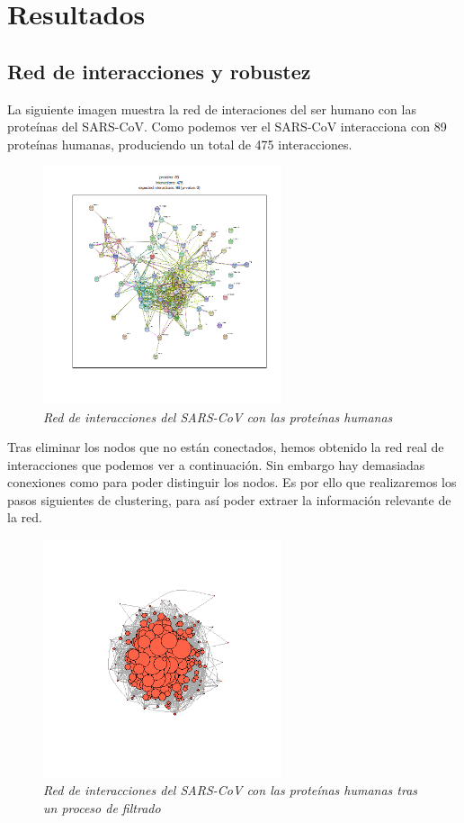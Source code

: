 
\section{Resultados}

\subsection{Red de interacciones y robustez}

La siguiente imagen muestra la red de interaciones del ser humano con las proteínas del SARS-CoV. Como podemos ver el SARS-CoV interacciona con 89 proteínas humanas, produciendo un total de 475 interacciones. 
\begin{figure}
	\centering
		\includegraphics[width=70mm,scale=1.2]{figures/string_hits.png}
		\caption{\textit{Red de interacciones del SARS-CoV con las proteínas humanas}}
\end{figure}

Tras eliminar los nodos que no están conectados, hemos obtenido la red real de interacciones que podemos ver a continuación. Sin embargo hay demasiadas conexiones como para poder distinguir los nodos. Es por ello que realizaremos los pasos siguientes de clustering, para así poder extraer la información relevante de la red. 
\begin{figure}
	\centering
		\includegraphics[width=70mm,scale=1.2]{figures/hits.network_graph.png}
		\caption{\textit{Red de interacciones del SARS-CoV con las proteínas humanas tras un proceso de filtrado}}

\end{figure}


